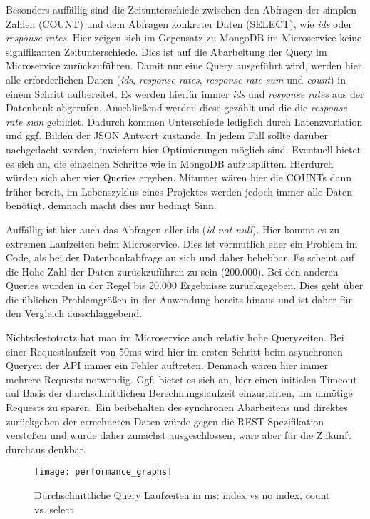 Besonders auffällig sind die Zeitunterschiede zwischen den Abfragen der simplen Zahlen (COUNT) und dem Abfragen konkreter Daten (SELECT), wie \textit{ids} oder \textit{response rates}. Hier zeigen sich im Gegensatz zu MongoDB im Microservice keine signifikanten Zeitunterschiede. Dies ist auf die Abarbeitung der Query im Microservice zurückzuführen. Damit nur eine Query ausgeführt wird, werden hier alle erforderlichen Daten (\textit{ids}, \textit{response rates}, \textit{response rate sum} und \textit{count}) in einem Schritt aufbereitet. Es werden hierfür immer \textit{ids} und \textit{response rates} aus der Datenbank abgerufen. Anschließend werden diese gezählt und die die \textit{response rate sum} gebildet. Dadurch kommen Unterschiede lediglich durch Latenzvariation und ggf. Bilden der JSON Antwort zustande.
In jedem Fall sollte darüber nachgedacht werden, inwiefern hier Optimierungen möglich sind. Eventuell bietet es sich an, die einzelnen Schritte wie in MongoDB aufzusplitten. Hierdurch würden sich aber vier Queries ergeben. Mitunter wären hier die COUNTs dann früher bereit, im Lebenszyklus eines Projektes werden jedoch immer alle Daten benötigt, demnach macht dies nur bedingt Sinn. 

Auffällig ist hier auch das Abfragen aller ids (\textit{id not null}). Hier kommt es zu extremen Laufzeiten beim Microservice. Dies ist vermutlich eher ein Problem im Code, als bei der Datenbankabfrage an sich und daher behebbar. Es scheint auf die Hohe Zahl der Daten zurückzuführen zu sein (200.000). Bei den anderen Queries wurden in der Regel bis 20.000 Ergebnisse zurückgegeben. Dies geht über die üblichen Problemgrößen in der Anwendung bereits hinaus und ist daher für den Vergleich ausschlaggebend.

Nichtsdestotrotz hat man im Microservice auch relativ hohe Queryzeiten. Bei einer Requestlaufzeit von 50ms wird hier im ersten Schritt beim asynchronen Queryen der API immer ein Fehler auftreten. Demnach wären hier immer mehrere Requests notwendig. Ggf. bietet es sich an, hier einen initialen Timeout auf Basis der durchschnittlichen Berechnungslaufzeit einzurichten, um unnötige Requests zu sparen. Ein beibehalten des synchronen Abarbeitens und direktes zurückgeben der errechneten Daten würde gegen die REST Spezifikation verstoßen und wurde daher zunächst ausgeschlossen, wäre aber für die Zukunft durchaus denkbar.

\begin{figure}[!ht]
    \centering
    \caption{Durchschnittliche Query Laufzeiten in ms: index vs no index, count vs. select}
    \label{fig:perftestgraph}
    \texttt{[image: performance\_graphs]}
\end{figure}

